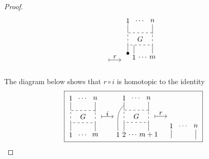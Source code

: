 \documentclass{amsart}
\renewcommand{\1}{\mathbf{1}}
\theoremstyle{definition}
\begin{document}
\begin{proof}
\begin{equation*}
{\begin{tikzpicture}[scale=.6]
		\node at (3,.75) {$r$}; \draw [|->] (2.5,.5) -- (3.5,.5);
		\end{tikzpicture}
		\ %
		\begin{tikzpicture}[scale=.6]
		\node at (0,2) {$1$}; \draw (0,1.7) -- (0,1);
		\node at (1,2) {$\dots$};
		\node at (2,2) {$n$}; \draw (2,1.7) -- (2,.9);
		
		\draw [dashed] (0,0) rectangle (2,1); \node at (1, .5) {$G$};
		
		\node at(0,-.7) {$\bullet$}; \draw (0,-.7) -- (0,0);
		\node at (.5,-1) {$1$}; \draw (.5,-.7) -- (.5,0);
		\node at (1.25,-1) {$\dots$};
		\node at (2,-1) {$m$}; \draw (2,-.7) -- (2,0);
		\end{tikzpicture}}
	\end{equation*}\\
	The diagram below shows that $r\circ i$ is homotopic to the identity\\
	\begin{equation*}
	\boxed{\begin{tikzpicture}[scale=.6]
		\node at (0,2) {$1$}; \draw (0,1.7) -- (0,1);
		\node at (1,2) {$\dots$};
		\node at (2,2) {$n$}; \draw (2,1.7) -- (2,.9);
		
		\draw [dashed] (0,0) rectangle (2,1); \node at (1, .5) {$G$};
		
		\node at (0,-1) {$1$}; \draw (0,-.7) -- (0,0);
		\node at (1,-1) {$\dots$};
		\node at (2,-1) {$m$}; \draw (2,-.7) -- (2,0);
		
		\node at (3,.75) {$i$}; \draw [|->] (2.5,.5) -- (3.5,.5);
		\end{tikzpicture}
		\begin{tikzpicture}[scale=.6]
		\node at (0,2) {$1$}; \draw (0,1.7) -- (0,1);
		\node at (1,2) {$\dots$};
		\node at (2,2) {$n$}; \draw (2,1.7) -- (2,.9);
		
		\draw [dashed] (0,0) rectangle (2,1); \node at (1, .5) {$G$};
		
		\node at (-.5,-1) {$1$}; \draw (-.5,-.7)  to[out=90,in=-140]  (0,1.4);
		\node at (0,-1) {$2$}; \draw (0,-.7) -- (0,0);
		\node at (.75,-1) {$\dots$};
		\node at (2,-1) {$m+1$}; \draw (2,-.7) -- (2,0);
		
		\node at (3,.75) {$r$}; \draw [|->] (2.5,.5) -- (3.5,.5);
		\end{tikzpicture}
		\begin{tikzpicture}[scale=.6]
		\node at (0,2) {$1$}; \draw (0,1.7) -- (0,1);
		\node at (1,2) {$\dots$};
		\node at (2,2) {$n$}; \draw (2,1.7) -- (2,.9);
		

\end{tikzpicture}}
\end{equation*}
\end{proof}
\end{document}
